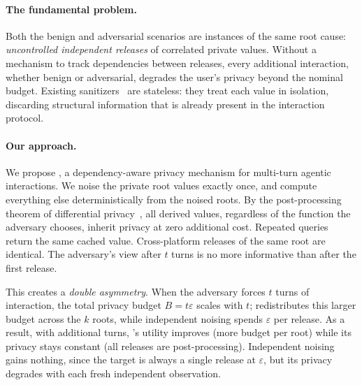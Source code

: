 \paragraph{The fundamental problem.} Both the benign and adversarial scenarios are instances of the same root cause: \emph{uncontrolled independent releases} of correlated private values. Without a mechanism to track dependencies between releases, every additional interaction, whether benign or adversarial, degrades the user's privacy beyond the nominal budget. Existing sanitizers~\cite{chowdhury2025,wu2025capecontextawarepromptperturbation} are stateless: they treat each value in isolation, discarding structural information that is already present in the interaction protocol.
 
\paragraph{Our approach.} We propose \sysname{}, a dependency-aware privacy mechanism for multi-turn agentic interactions. We noise the private root values exactly once, and compute everything else deterministically from the noised roots. By the post-processing theorem of differential privacy~\cite{dwork2014algorithmic}, all derived values, regardless of the function the adversary chooses, inherit privacy at zero additional cost. Repeated queries return the same cached value. Cross-platform releases of the same root are identical. The adversary's view after $t$ turns is no more informative than after the first release.

This creates a \emph{double asymmetry}. When the adversary forces $t$ turns of interaction, the total privacy budget $B = t\varepsilon$ scales with $t$; \sysname{} redistributes this larger budget across the $k$ roots, while independent noising spends $\varepsilon$ per release. As a result, with additional turns, \sysname{}'s utility improves (more budget per root) while its privacy stays constant (all releases are post-processing). Independent noising gains nothing, since the target is always a single release at $\varepsilon$, but its privacy degrades with each fresh independent observation.
 
 
